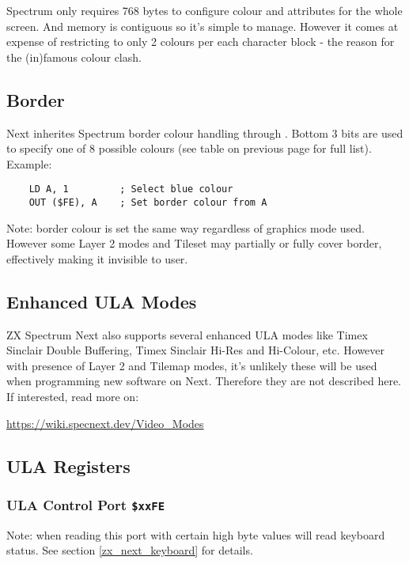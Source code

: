 Spectrum only requires 768 bytes to configure colour and attributes for the whole screen. And memory is contiguous so it's simple to manage. However it comes at expense of restricting to only 2 colours per each character block - the reason for the (in)famous colour clash.


\subsection{Border}

Next inherites Spectrum border colour handling through . Bottom 3 bits are used to specify one of 8 possible colours (see table on previous page for full list). Example:

\begin{lstlisting}
    LD A, 1			; Select blue colour
    OUT ($FE), A	; Set border colour from A
\end{lstlisting}

Note: border colour is set the same way regardless of graphics mode used. However some Layer 2 modes and Tileset may partially or fully cover border, effectively making it invisible to user.

\subsection{Enhanced ULA Modes}

ZX Spectrum Next also supports several enhanced ULA modes like Timex Sinclair Double Buffering, Timex Sinclair Hi-Res and Hi-Colour, etc. However with presence of Layer 2 and Tilemap modes, it's unlikely these will be used when programming new software on Next. Therefore they are not described here. If interested, read more on:

\url{https://wiki.specnext.dev/Video_Modes}


\subsection{ULA Registers}

\subsubsection{ULA Control Port {\tt \$xxFE}}

\begin{NextPort}
\end{NextPort}

Note: when reading this port with certain high byte values will read keyboard status. See section \ref{zx_next_keyboard} for details.


\pagebreak